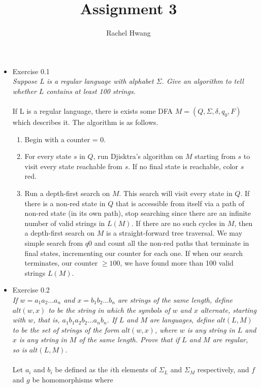 \documentclass[12pt]{article}
\title{Assignment 3}
\author{Rachel Hwang}
\begin{document}
\maketitle

\begin{itemize}
\item{Exercise 0.1} \\
\emph{Suppose L is a regular language with alphabet $\Sigma$. Give an algorithm to tell whether $L$ contains at least 100 strings.} \\
\\
If L is a regular language, there is exists some DFA $M = (Q,\Sigma,\delta,q_0,F)$ which describes it. The algorithm is as follows.
\begin{enumerate}
\item Begin with a counter = 0.
\item For every state $s$ in $Q$, run Djisktra's algorithm on $M$ starting from $s$ to visit every state reachable from $s$. If no final state is reachable, color $s$ red. 
\item Run a depth-first search on $M$. This search will visit every state in $Q$. If there is a non-red state in $Q$ that is accessible from itself via a path of non-red state (in its own path), stop searching since there are an infinite number of valid strings in $L(M)$. If there are no such cycles in $M$, then a depth-first search on $M$ is a straight-forward tree traversal. We may simple search from $q0$ and count all the non-red paths that terminate in final states, incrementing our counter for each one. If when our search terminates, our counter $\geq 100$, we have found more than 100 valid strings $L(M)$.
\end{enumerate}
\item{Exercise 0.2} \\
\emph{If $w = a_1a_2\dots a_n$ and $x = b_1b_2\dots b_n$ are strings of the same length, define $alt(w, x)$ to be the string in which the symbols of $w$ and $x$ alternate, starting with $w$, that is, $a_1b_1a_2b_2 \dots a_nb_n$. If $L$ and $M$ are languages, define $alt(L, M)$ to be the set of strings of the form $alt(w, x)$, where $w$ is any string in $L$ and $x$ is any string in $M$ of the same length. Prove that if $L$ and $M$ are regular, so is $alt(L, M)$.} \\
\\
Let $a_i$ and $b_i$ be defined as the $i$th elements of $\Sigma_L$ and $\Sigma_M$ respectively, and $f$ and $g$ be homomorphisms where \\

\end{itemize}
\end{document}
